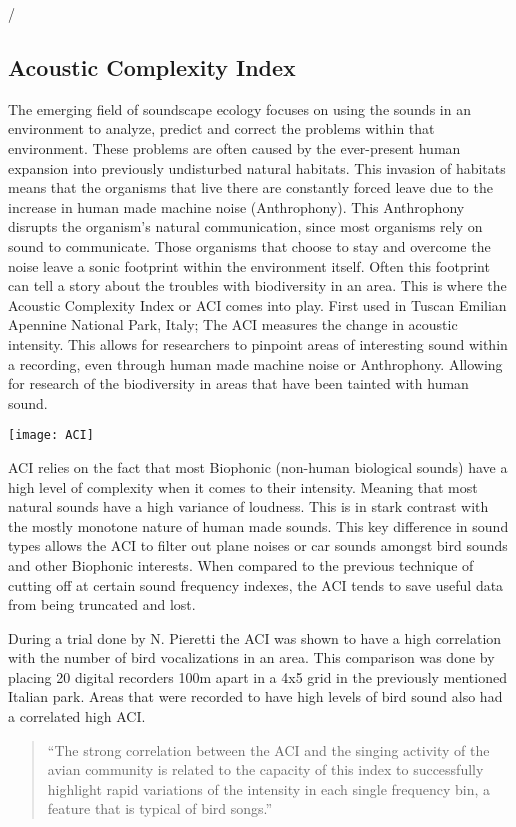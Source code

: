/\subsection{Acoustic Complexity Index}
\par The emerging field of soundscape ecology focuses on using the sounds in an environment to analyze, predict and correct the problems within that environment. These problems are often caused by the ever-present human expansion into previously undisturbed natural habitats. This invasion of habitats means that the organisms that live there are constantly forced leave due to the increase in human made machine noise (Anthrophony). This Anthrophony disrupts the organism's natural communication, since most organisms rely on sound to communicate. Those organisms that choose to stay and overcome the noise leave a sonic footprint within the environment itself. Often this footprint can tell a story about the troubles with biodiversity in an area. This is where the Acoustic Complexity Index or ACI comes into play. First used in Tuscan Emilian Apennine National Park, Italy; The ACI measures the change in acoustic intensity. This allows for researchers to pinpoint areas of interesting sound within a recording, even through human made machine noise or Anthrophony. Allowing for research of the biodiversity in areas that have been tainted with human sound.
\begin{center}
  \texttt{[image: ACI]} \\[12pt]
\end{center}
\par ACI relies on the fact that most Biophonic (non-human biological sounds) have a high level of complexity when it comes to their intensity. Meaning that most natural sounds have a high variance of loudness. This is in stark contrast with the mostly monotone nature of human made sounds. This key difference in sound types allows the ACI to filter out plane noises or car sounds amongst bird sounds and other Biophonic interests. When compared to the previous technique of cutting off at certain sound frequency indexes, the ACI tends to save useful data from being truncated and lost.
\par During a trial done by N. Pieretti the ACI was shown to have a high correlation with the number of bird vocalizations in an area. This comparison was done by placing 20 digital recorders 100m apart in a 4x5 grid in the previously mentioned Italian park. Areas that were recorded to have high levels of bird sound also had a correlated high ACI.
\begin{quote}
 ``The strong correlation between the ACI and the singing activity of the avian community
  is related to the capacity of this index to successfully highlight rapid variations of the
  intensity in each single frequency bin, a feature that is typical of bird songs.''\cite{pieretti}
\end{quote}

